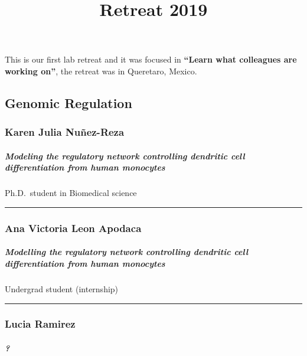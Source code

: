 \documentclass[]{article}
\title{Retreat 2019}
\author{}
\date{}
\let\oldsubparagraph\subparagraph
\renewcommand{\subparagraph}[1]{\oldsubparagraph{#1}\mbox{}}
\begin{document}
\maketitle

{
\setcounter{tocdepth}{3}
\tableofcontents
}
This is our first lab retreat and it was focused in \textbf{``Learn what
colleagues are working on''}, the retreat was in Queretaro, Mexico.

\subsection{Genomic Regulation}\label{genomic-regulation}

\subsubsection{Karen Julia Nuñez-Reza}\label{karen-julia-nunez-reza}

\subparagraph{ Modeling the regulatory network controlling dendritic
cell differentiation from human
monocytes}\label{modeling-the-regulatory-network-controlling-dendritic-cell-differentiation-from-human-monocytes}

Ph.D.~student in Biomedical science

\begin{center}\rule{0.5\linewidth}{\linethickness}\end{center}

\subsubsection{Ana Victoria Leon
Apodaca}\label{ana-victoria-leon-apodaca}

\subparagraph{ Modelling the regulatory network controlling dendritic
cell differentiation from human
monocytes}\label{modelling-the-regulatory-network-controlling-dendritic-cell-differentiation-from-human-monocytes}

Undergrad student (internship)

\begin{center}\rule{0.5\linewidth}{\linethickness}\end{center}

\subsubsection{Lucia Ramirez}\label{lucia-ramirez}

\subparagraph{ ?}\label{section}
\end{document}

